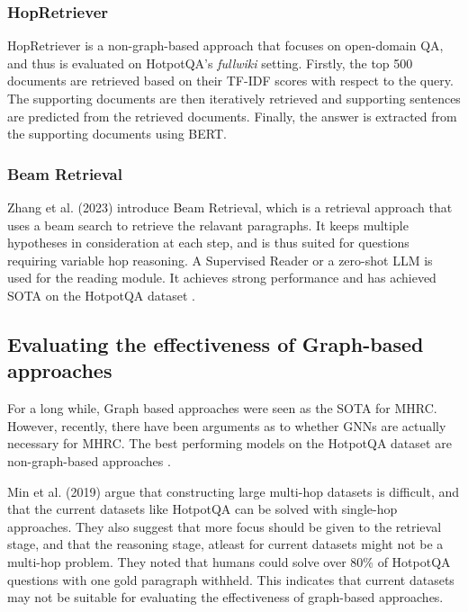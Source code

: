 \documentclass[sigplan,screen]{acmart}
\begin{document}
\subsubsection{HopRetriever}
HopRetriever \cite{RN149} is a non-graph-based approach that focuses on open-domain QA, and thus is evaluated on HotpotQA's \emph{fullwiki} 
setting. Firstly, the top 500 documents are retrieved based on their TF-IDF scores with respect to the query. The supporting documents
are then iteratively retrieved and supporting sentences are predicted from the retrieved documents. Finally, the answer is extracted 
from the supporting documents using BERT.

\subsubsection{Beam Retrieval}
 Zhang et al. (2023)\cite{RN105} introduce Beam Retrieval, which is a retrieval approach that uses a beam search to retrieve the relavant 
 paragraphs. It keeps multiple hypotheses in consideration at each step, and is thus suited for questions requiring variable hop reasoning. 
 A Supervised Reader or a zero-shot LLM is used for the reading module. It achieves strong performance and has achieved SOTA on the 
 HotpotQA dataset \cite{RN116}.


\subsection{Evaluating the effectiveness of Graph-based approaches}

For a long while, Graph based approaches were seen as the SOTA for MHRC. However, recently, there have been arguments as to whether GNNs 
are actually necessary for MHRC. The best performing models on the HotpotQA dataset \cite{RN116} are non-graph-based approaches \cite{RN105} 
\cite{RN149}.

Min et al. (2019) \cite{RN150} argue that constructing large multi-hop datasets is difficult, and that the current datasets like HotpotQA can 
be solved with single-hop approaches. They also suggest that more focus should be given to the retrieval stage, and that the reasoning stage, 
atleast for current datasets might not be a multi-hop problem. They noted that humans could solve over 80\% of HotpotQA questions with one 
gold paragraph withheld. This indicates that current datasets may not be suitable for evaluating the effectiveness of graph-based approaches.
\end{document}
